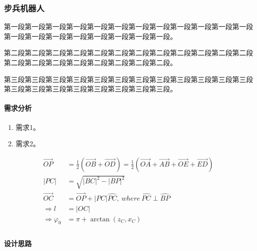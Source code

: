 
\subsubsection{步兵机器人}

    第一段第一段第一段第一段第一段第一段第一段第一段第一段第一段第一段第一段第一段第一段第一段第一段第一段第一段第一段第一段。\par
    
    第二段第二段第二段第二段第二段第二段第二段第二段第二段第二段第二段第二段第二段第二段第二段第二段第二段第二段第二段第二段。\par
    
    第三段第三段第三段第三段第三段第三段第三段第三段第三段第三段第三段第三段第三段第三段第三段第三段第三段第三段第三段第三段。\par

    \paragraph{需求分析}
    
        \begin{enumerate}
            \item 需求1。
        
            \item 需求2。
        \end{enumerate}
    
        \begin{align*}
            \Vec{OP} &= \frac{1}{2} ( \Vec{OB} + \Vec{OD} ) = \frac{1}{2} ( \Vec{OA} + \Vec{AB} + \Vec{OE} + \Vec{ED} ) \\
            |PC| &= \sqrt{|BC|^2 - |BP|^2} \\
            \Vec{OC} &= \Vec{OP} + |PC|\hat{PC} , ~{where}~ \hat{PC} \perp \hat{BP} \\
            \Rightarrow l &= |OC| \\
            \Rightarrow \varphi_0 &= \pi + \arctan(z_C, x_C) \\
        \end{align*}
    
    \paragraph{设计思路}
        
